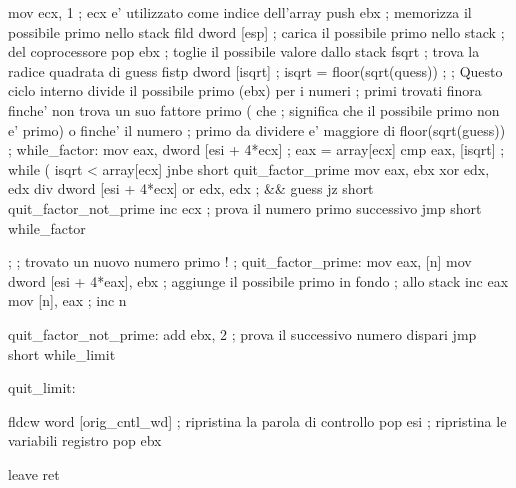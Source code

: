\begin{AsmCodeListing}[label=prime2.asm]
        mov     ecx, 1                  ; ecx e' utilizzato come indice dell'array
        push    ebx                     ; memorizza il possibile primo nello stack
        fild    dword [esp]             ; carica il possibile primo nello stack
                                        ; del coprocessore
        pop     ebx                     ; toglie il possibile valore dallo stack
        fsqrt                           ; trova la radice quadrata di guess
        fistp   dword [isqrt]           ; isqrt = floor(sqrt(quess))
;
; Questo ciclo interno divide il possibile primo (ebx) per i numeri
; primi trovati finora finche' non trova  un suo fattore primo ( che 
; significa che il possibile primo non e' primo) o finche' il numero
; primo da dividere e' maggiore di floor(sqrt(guess))  
;
while_factor:
        mov     eax, dword [esi + 4*ecx]        ; eax = array[ecx]
        cmp     eax, [isqrt]                    ; while ( isqrt < array[ecx] 
        jnbe    short quit_factor_prime
        mov     eax, ebx
        xor     edx, edx
        div     dword [esi + 4*ecx]     
        or      edx, edx                        ; && guess %
        jz      short quit_factor_not_prime
        inc     ecx                             ; prova il numero primo successivo
        jmp     short while_factor

;
; trovato un nuovo numero primo !
;
quit_factor_prime:
        mov     eax, [n]
        mov     dword [esi + 4*eax], ebx        ; aggiunge il possibile primo in fondo 
        																			  ; allo stack
        inc     eax
        mov     [n], eax                        ; inc n

quit_factor_not_prime:
        add     ebx, 2                          ; prova il successivo numero dispari
        jmp     short while_limit

quit_limit:

        fldcw   word [orig_cntl_wd]             ; ripristina la parola di controllo						          pop     esi                             ; ripristina le variabili registro
        pop     ebx

        leave
        ret 
\end{AsmCodeListing}
